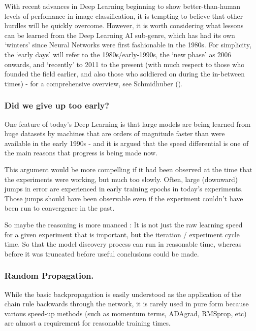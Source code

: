 \documentclass[citeauthoryear]{llncs}
\begin{document}
With recent advances in Deep Learning beginning to show better-than-human 
levels of perfomance in image classification, it is tempting to believe 
that other hurdles will be quickly overcome.  However, it is worth considering
what lessons can be learned from the Deep Learning AI sub-genre, which has 
had its own `winters' since Neural Networks were first fashionable in 
the 1980s.  For simplicity, the `early days' will refer to the 1980s/early-1990s,
the `new phase' as 2006 onwards, and `recently' to 2011 to the present 
(with much respect to those who founded the field earlier, and also 
those who soldiered on during the in-between times) - for a comprehensive 
overview, see Schmidhuber (\cite{SchmidhuberOverview}).


\subsubsection*{Did we give up too early?}
 
One feature of today's Deep Learning is that large models are being learned
from huge datasets by machines that are orders of magnitude faster than 
were available in the early 1990s - and it is argued that the speed 
differential is one of the main reasons that progress is being made now.

This argument would be more compelling if it had been observed at the time 
that the experiments were working, but much too slowly.  Often, large (downward)
jumps in error are experienced in early training epochs in today's experiments.  
Those jumps should have been observable even if the experiment couldn't have 
been run to convergence in the past.  

So maybe the reasoning is more nuanced : It is not just the raw learning speed 
for a given experiment that is important, but the iteration / experiment cycle time.
So that the model discovery process can run in reasonable time, whereas before
it was truncated before useful conclusions could be made.



\subsubsection*{Random Propagation.}

While the basic backpropagation is easily understood as the application 
of the chain rule backwards through the network, it is rarely used in pure form
because various speed-up methods (such as momentum terms, ADAgrad, RMSprop, etc)
are almost a requirement for reasonable training times.  
\end{document}
